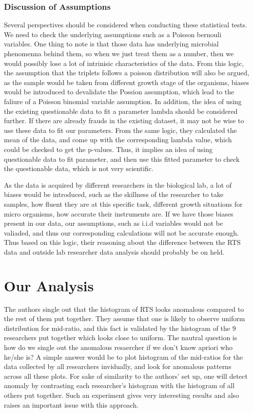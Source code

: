 \documentclass{article}
\begin{document}
\subsubsection{Discussion of
Assumptions}\label{discussion-of-assumptions}

Several perspectives should be considered when conducting these
statistical tests. We need to check the underlying assumptions such as a
Poisson bernouli variables. One thing to note is that those data has
underlying microbial phenomenna behind them, so when we just treat them
as a number, then we would possibly lose a lot of intrinisic
characteristics of the data. From this logic, the assumption that the
triplets follows a poisson distribution will also be argued, as the
sample would be taken from different growth stage of the organisms,
biases would be introduced to devalidate the Possion assumption, which
lead to the faliure of a Poisson binomial variable assumption. In
addition, the idea of using the existing questionable data to fit a
parameter lambda should be considered further. If there are already
frauds in the existing dataset, it may not be wise to use these data to
fit our parameters. From the same logic, they calculated the mean of the
data, and come up with the corresponding lambda value, which could be
checked to get the p-values. Thus, it implies an idea of using
questionable data to fit parameter, and then use this fitted parameter
to check the questionable data, which is not very scientific.

As the data is acquired by different researchers in the biological lab,
a lot of biases would be introduced, such as the skillness of the
researcher to take samples, how fluent they are at this specific task,
different growth situations for micro organisms, how accurate their
instruments are. If we have those biases present in our data, our
assumptions, such as i.i.d variables would not be valiaded, and thus our
corresponding calculations will not be accurate enough. Thus based on
this logic, their reasoning about the difference between the RTS data
and outside lab researcher data analysis should probably be on held.

    \section{Our Analysis}\label{our-analysis}

    The authors single out that the histogram of RTS looks anomalous
compared to the rest of them put together. They assume that one is
likely to observe uniform distribution for mid-ratio, and this fact is
validated by the histogram of the 9 researchers put together which looks
close to uniform. The nautral question is how do we single out the
anomalous resaercher if we don't know apriori who he/she is? A simple
answer would be to plot histogram of the mid-ratios for the data
collected by all researchers invidually, and look for anomalous patterns
across all these plots. For sake of similarity to the authors' set up,
one will detect anomaly by contrasting each researcher's histogram with
the histogram of all others put together. Such an experiment gives very
interesting results and also raises an important issue with this
approach.
\end{document}

